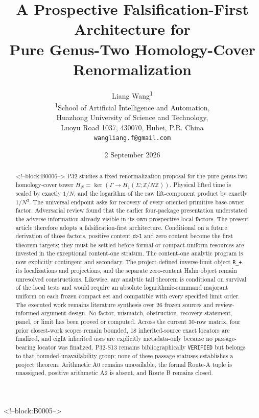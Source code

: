 \documentclass[11pt]{article}
\title{A Prospective Falsification-First Architecture for\\
Pure Genus-Two Homology-Cover Renormalization}
\author{Liang Wang\textsuperscript{1}\\
\small \textsuperscript{1}School of Artificial Intelligence and Automation,\\
\small Huazhong University of Science and Technology,\\
\small Luoyu Road 1037, 430070, Hubei, P.R. China\\
\small \texttt{wangliang.f@gmail.com}}
\date{2 September 2026}
\begin{document}
\maketitle

<!--block:B0005-->
\begin{abstract}

<!--block:B0006-->
P32 studies a fixed renormalization proposal for the pure genus-two
homology-cover tower
$H_N=\ker(\Gamma\to H_1(\Sigma;\mathbb Z/N\mathbb Z))$. Physical
lifted time is scaled by exactly $1/N$, and the logarithm of the
raw lift-component product by exactly $1/N^3$. The universal
endpoint asks for recovery of every oriented primitive base-owner
factor. Adversarial review found that the earlier four-package presentation
understated the adverse information already visible in its own
prospective local factors. The present article therefore adopts a
falsification-first architecture. Conditional on a future derivation of
those factors, positive content \texttt{d\textgreater{}1} and zero
content become the first theorem targets; they must be settled before
formal or compact-uniform resources are invested in the exceptional
content-one stratum. The content-one analytic program is now explicitly
contingent and secondary. The project-defined inverse-limit object
\texttt{R\_+}, its localizations and projections, and the separate
zero-content Hahn object remain unresolved constructions. Likewise, any
analytic tail theorem is conditional on survival of the local tests and
would require an absolute logarithmic-summand majorant uniform on each
frozen compact set and compatible with every specified limit order. The
executed work remains literature synthesis over 26 frozen sources and
review-informed argument design. No factor, mismatch, obstruction,
recovery statement, panel, or limit has been proved or computed. Across the current 30-row matrix, four prior closest-work scopes remain
bounded, 18 inherited-source exact locators are finalized, and eight
inherited uses are explicitly metadata-only because no passage-bearing
locator was finalized. P32-S13 remains bibliographically
\texttt{VERIFIED} but belongs to that bounded-unavailability group; none
of these passage statuses establishes a project theorem. Arithmetic A0 remains unavailable, the formal
Route-A tuple is unassigned, positive arithmetic A2 is absent, and Route
B remains closed.
\end{abstract}
\end{document}
